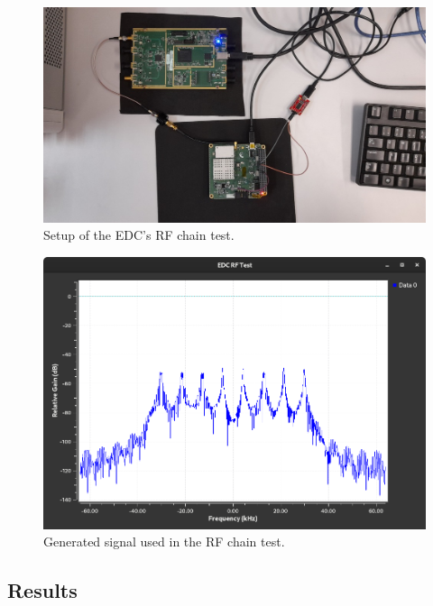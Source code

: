 \begin{figure}[!ht]
    \begin{center}
        \includegraphics[width=\textwidth]{figures/edc_report/rf-chain-setup}
        \caption{Setup of the EDC's RF chain test.}
        \label{fig:edc-rf-chain-test-setup}
    \end{center}
\end{figure}

\begin{figure}[!ht]
    \begin{center}
        \includegraphics[width=\textwidth]{figures/edc_report/edc-rf-test-signal}
        \caption{Generated signal used in the RF chain test.}
        \label{fig:edc-rf-signal}
    \end{center}
\end{figure}

\subsection{Results}

